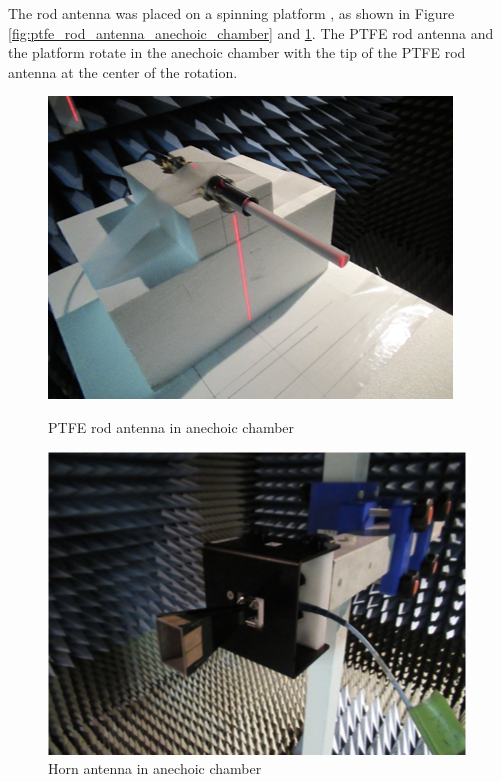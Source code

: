 \documentclass[a4paper,12pt]{report}
\begin{document}
The rod antenna was placed on a spinning platform ,
as shown in Figure \ref{fig:ptfe_rod_antenna_anechoic_chamber}
and \ref{img:horn_antenna_anechoic_chamber}.
The PTFE rod antenna and the platform rotate in the anechoic chamber
with the tip of the PTFE rod antenna at the center of the rotation.

\begin{figure}
  \centering
  \begin{minipage}{0.45\textwidth}
    \centering
    \includegraphics[clip, keepaspectratio, width=0.9\linewidth]{img/ptfe_rod_antenna_anechoic_chamber.png}
    \caption{PTFE rod antenna in anechoic chamber}
    \label{fig:ptfe_rod_antenna_anechoic_chamber} 
  \end{minipage}\hfill
  \begin{minipage}{0.45\textwidth}
    \centering
    \includegraphics[clip, keepaspectratio, width=0.9\linewidth]{img/horn_antenna_anechoic_chamber.png}
    \caption{Horn antenna in anechoic chamber}
    \label{img:horn_antenna_anechoic_chamber}
  \end{minipage}\hfill
\end{figure}
\end{document}
